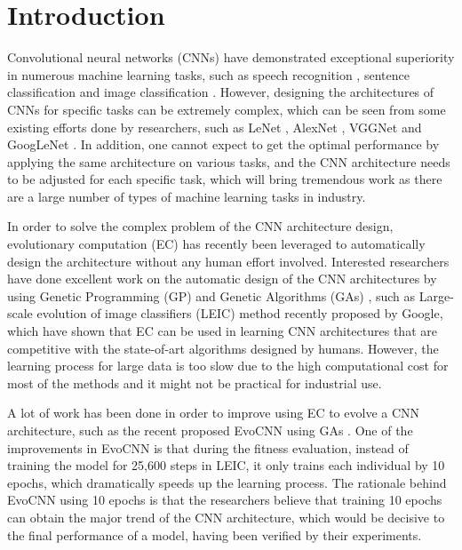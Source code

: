 \documentclass[conference]{IEEEtran}
\begin{document}
\section{Introduction}
Convolutional neural networks (CNNs) have demonstrated exceptional superiority in numerous machine learning tasks, such as speech recognition \cite{CNNspeech:Ossama}, sentence classification \cite{CNNsentence:Yoon} and image classification \cite{ImageNet:Alex}. However, designing the architectures of CNNs for specific tasks can be extremely complex, which can be seen from some existing efforts done by researchers, such as LeNet \cite{ZipcodeRecognition:LeCun}\cite{DocumentRecognition:LeCun}, AlexNet \cite{ImageNet:Alex}, VGGNet \cite{CNNverydeep:Simonyan} and GoogLeNet \cite{CNNdeeper:Szegedy}. %
In addition, one cannot expect to get the optimal performance by applying the same architecture on various tasks, and the CNN architecture needs to be adjusted for each specific task, which will bring tremendous work as there are a large number of types of machine learning tasks in industry.


In order to solve the complex problem of the CNN architecture design, evolutionary computation (EC) has recently been leveraged to automatically design the architecture without any human effort involved. Interested researchers have done excellent work on the automatic design of the CNN architectures by using Genetic Programming (GP) \cite{CNNGP:Suganuma} and Genetic Algorithms (GAs) \cite{CNNevolve:Stanley}, such as Large-scale evolution of image classifiers (LEIC) method \cite{LEIC:Real} recently proposed by Google, which have shown that EC can be used in learning CNN architectures that are competitive with the state-of-art algorithms designed by humans. However, the learning process for large data is too slow due to the high computational cost for most of the methods and it might not be practical for industrial use.


A lot of work has been done in order to improve using EC to evolve a CNN architecture, such as the recent proposed EvoCNN using GAs \cite{EvolveCNN:Yanan}. One of the improvements in EvoCNN is that during the fitness evaluation, instead of training the model for 25,600 steps in LEIC, it only trains each individual by 10 epochs, which dramatically speeds up the learning process. The rationale behind EvoCNN using 10 epochs is that the researchers believe that training 10 epochs can obtain the major trend of the CNN architecture, which would be decisive to the final performance of a model, having been verified by their experiments.
\end{document}
